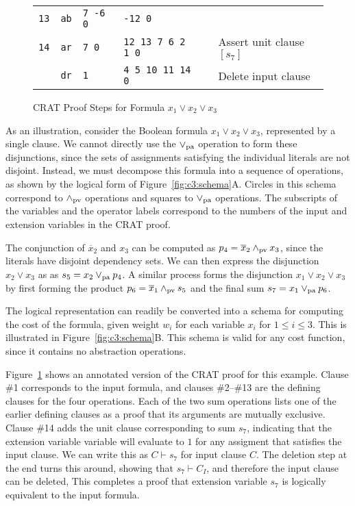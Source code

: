 \documentclass{llncs}
\newcommand{\pand}{\mathbin{\land_{\rm pv}}}
\newcommand{\por}{\mathbin{\lor_{\rm pa}}}
\newcommand{\tautology}{1}
\newcommand{\obar}[1]{\overline{#1}}
\newcommand{\turnstile}{\vdash}
\begin{document}
\begin{figure}
{\begin{tabular}{llllll}
    {\tt 13} & {\tt ab}  & {\tt  7 -6 0}    & {\tt -12 0} & &  \\  %
    {\tt 14} & {\tt ar}  & {\tt 7 0} & {\tt 12 13 7 6 2 1 0} & & Assert unit clause $[s_7]$ \\
             & {\tt dr}  & {\tt 1}  & {\tt 4 5 10 11 14 0} & & Delete input clause \\
  \end{tabular}
  }
  \caption{CRAT Proof Steps for Formula $x_1 \lor x_2 \lor x_3$}
  \label{fig:c3:crat}
\end{figure}
    
As an illustration, consider the Boolean formula $x_1 \lor x_2 \lor
x_3$, represented by a single clause.  We cannot directly use the
$\por$ operation to form these disjunctions, since the sets of assignments
satisfying the individual literals are not disjoint.  Instead, we must
decompose this formula into a sequence of operations, as shown by the
logical form of Figure~\ref{fig:c3:schema}A\@.  Circles in this schema
correspond to $\pand$ operations and squares to $\por$ operations.
The subscripts of the variables and the operator labels correspond to
the numbers of the input and extension variables in the CRAT proof.

The conjunction of $\obar{x}_2$ and $x_3$ can be computed as $p_4 =
\obar{x}_2 \pand x_3$, since the literals have disjoint dependency
sets. We can then express the disjunction $x_2 \lor x_3$ as
as $s_5 = x_2 \por p_4$.  A similar process forms the
disjunction $x_1 \lor x_2 \lor x_3$ by first forming the product $p_6
= \obar{x}_1 \pand s_5$ and the final sum $s_7 = x_1 \por p_6$.

The logical representation can readily be converted into a schema for
computing the cost of the formula, given weight $w_i$ for each
variable $x_i$ for $1 \leq i \leq 3$.  This is illustrated in
Figure~\ref{fig:c3:schema}B\@.  This schema is valid for any cost
function, since it contains no abstraction operations.

Figure~\ref{fig:c3:crat} shows an annotated version of the CRAT proof
for this example.  Clause \#1 corresponds to the input formula, and
clauses \#2--\#13 are the defining clauses for the four operations.
Each of the two sum operations lists one of the earlier defining
clauses as a proof that its arguments are mutually exclusive.
Clause \#14 adds the unit clause corresponding to sum $s_7$,
indicating that the extension variable variable will evaluate to
$\tautology$  for any assigment that satisfies the input clause.  We
can write this as $C \turnstile s_7$ for input clause $C$.  The
deletion step at the end turns this around, showing that $s_7
\turnstile C_I$, and therefore the input clause can be deleted, This
completes a proof that extension variable $s_7$ is logically
equivalent to the input formula.
\end{document}

